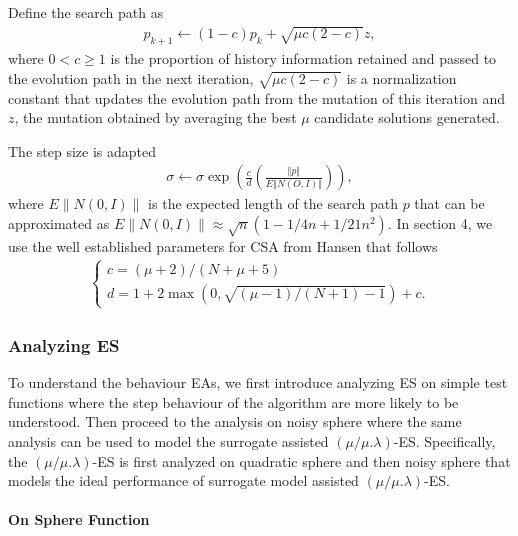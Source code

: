 Define the search path as 
\begin{align}
p_{k+1} \leftarrow (1-c)p_k + \sqrt{\mu c (2-c)} z,
\end{align}
where $0<c \geq 1$ is the proportion of history information retained and passed to the evolution path in the next iteration, $ \sqrt{\mu c (2-c)}$ is a normalization constant that updates the evolution path from the mutation of this iteration and $z$, the mutation obtained by averaging the best $\mu$ candidate solutions generated. 

The step size is adapted 
\begin{align}
\sigma \leftarrow \sigma \exp \left (  \frac{c}{d}  \left( \frac{\Vert p\Vert}{E \Vert N(O,I)\Vert } \right) \right ),
\end{align}
where $E\| N(0,I) \|$ is the expected length of the search path $p$ that can be approximated as $E\| N(0,I) \| \approx \sqrt{n} (1-1/4n + 1/21n^2)$. In section 4, we use the well established parameters for CSA from  Hansen \cite{hansen2016cma} that follows 
\begin{align}
\begin{cases}
c = (\mu+2)/(N+\mu+5)\\
d=1+2 \max\left (0, \sqrt{(\mu-1)/(N+1)-1} \right)+c.
\end{cases}
\end{align}


\subsubsection{Analyzing ES}\label{sssec:analysis_sphere_combined}\hfill

To understand the behaviour EAs, we first introduce analyzing ES on simple test functions where the step behaviour of the algorithm are more likely to be understood. Then proceed to the analysis on noisy sphere where the same analysis can be used to model the surrogate assisted $(\mu/\mu.\lambda)$-ES. Specifically, the $(\mu/\mu.\lambda)$-ES is first analyzed on quadratic sphere and then noisy sphere that models the ideal performance of surrogate model assisted $(\mu/\mu.\lambda)$-ES.    

 \paragraph{On Sphere Function}


